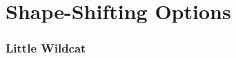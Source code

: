 \documentclass[letterpaper,openany,oneside,twocolumn]{book}
\begin{document}
\part*{Shape-Shifting Options}
\section*{Little Wildcat}
\vspace*{-2.7\fontdimen6\font}\hfill\\
\end{document}
